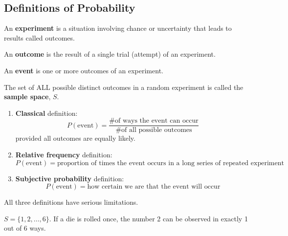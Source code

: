 \subsection{Definitions of Probability}

\begin{definition}
    An \textbf{experiment} is a situation involving chance or uncertainty that leads to results called outcomes.
\end{definition}

\begin{definition}
    An \textbf{outcome} is the result of a single trial (attempt) of an experiment.
\end{definition}

\begin{definition}
    An \textbf{event} is one or more outcomes of an experiment.
\end{definition}

\begin{definition}
    The set of ALL possible distinct outcomes in a random experiment is called the \textbf{sample space}, $S$.    
\end{definition}

\begin{definition}
    \phantom{}
    \begin{enumerate}
        \item \textbf{Classical} definition: 
        \[P(\text{event}) = \frac{\text{\# of ways the event can occur}}{\text{\# of all possible outcomes}}\]
        provided all outcomes are equally likely.
        \item \textbf{Relative frequency} definition:
        \[P(\text{event}) = \text{proportion of times the event occurs in a long series of repeated experiment}\]
        \item \textbf{Subjective probability} definition:
        \[P(\text{event}) = \text{how certain we are that the event will occur}\]
    \end{enumerate}
\end{definition}

\begin{note}
    All three definitions have serious limitations.
\end{note}

\begin{example}
    $S = \{1, 2, \ldots, 6\}$. If a die is rolled once, the number 2 can  be observed in exactly 1 out of 6 ways.
\end{example}

